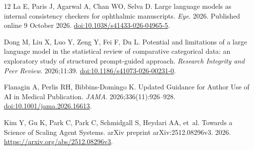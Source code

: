 \begin{thebibliography}{12}
La E, Paris J, Agarwal A, Chan WO, Selva D. Large language models as internal consistency checkers for ophthalmic manuscripts.
\emph{Eye}. 2026. Published online 9 October 2026.
\href{https://doi.org/10.1038/s41433-026-04965-5}{doi:10.1038/s41433-026-04965-5}.

Dong M, Liu X, Luo Y, Zeng Y, Fei F, Du L. Potential and limitations of a large language model in the statistical review of comparative categorical data: an exploratory study of structured prompt-guided approach.
\emph{Research Integrity and Peer Review}. 2026;11:39.
\href{https://doi.org/10.1186/s41073-026-00231-0}{doi:10.1186/s41073-026-00231-0}.

Flanagin A, Perlis RH, Bibbins-Domingo K. Updated Guidance for Author Use of {AI} in Medical Publication.
\emph{JAMA}. 2026;336(11):926--928.
\href{https://doi.org/10.1001/jama.2026.16613}{doi:10.1001/jama.2026.16613}.

Kim Y, Gu K, Park C, Park C, Schmidgall S, Heydari AA, et~al. Towards a Science of Scaling Agent Systems.
arXiv preprint arXiv:2512.08296v3. 2026.
\url{https://arxiv.org/abs/2512.08296v3}.

\end{thebibliography}

